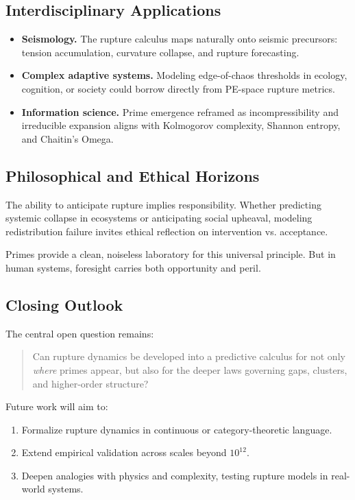 \documentclass[11pt]{article}
\theoremstyle{plain}
\theoremstyle{definition}
\begin{document}
\subsection{Interdisciplinary Applications}
\begin{itemize}
  \item \textbf{Seismology.} The rupture calculus maps naturally onto seismic precursors: tension accumulation, curvature collapse, and rupture forecasting.
  \item \textbf{Complex adaptive systems.} Modeling edge-of-chaos thresholds in ecology, cognition, or society could borrow directly from PE-space rupture metrics.
  \item \textbf{Information science.} Prime emergence reframed as incompressibility and irreducible expansion aligns with Kolmogorov complexity, Shannon entropy, and Chaitin’s Omega.
\end{itemize}

\subsection{Philosophical and Ethical Horizons}
The ability to anticipate rupture implies responsibility. Whether predicting systemic collapse in ecosystems or anticipating social upheaval, modeling redistribution failure invites ethical reflection on intervention vs. acceptance.  

Primes provide a clean, noiseless laboratory for this universal principle. But in human systems, foresight carries both opportunity and peril.

\subsection{Closing Outlook}
The central open question remains:
\begin{quote}
Can rupture dynamics be developed into a predictive calculus for not only \emph{where} primes appear, but also for the deeper laws governing gaps, clusters, and higher-order structure?
\end{quote}

Future work will aim to:
\begin{enumerate}
  \item Formalize rupture dynamics in continuous or category-theoretic language.  
  \item Extend empirical validation across scales beyond $10^{12}$.  
  \item Deepen analogies with physics and complexity, testing rupture models in real-world systems.  
\end{enumerate}
\end{document}
